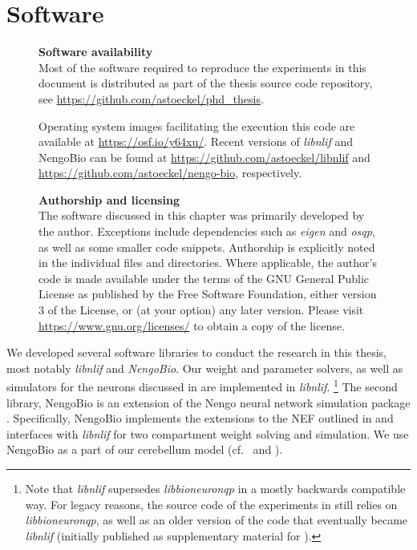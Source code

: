 
\chapter{Software}
\label{app:software}

\begin{figure}[b!]
\begin{shaded}
\small%
\sffamily%
\setlength{\parskip}{0.5em}
\noindent\textbf{Software availability}\\[0.25cm]
Most of the software required to reproduce the experiments in this document is distributed as part of the thesis source code repository, see \url{https://github.com/astoeckel/phd_thesis}.

Operating system images facilitating the execution this code are available at \url{https://osf.io/y64xu/}.
Recent versions of \emph{libnlif} and NengoBio can be found at \url{https://github.com/astoeckel/libnlif} and \url{https://github.com/astoeckel/nengo-bio}, respectively.
\end{shaded}
\end{figure}

\begin{figure}[b!]
\begin{shaded}
\small%
\sffamily%
\noindent\textbf{Authorship and licensing}\\[0.25cm]
The software discussed in this chapter was primarily developed by the author.
Exceptions include dependencies such as \emph{eigen} and \emph{osqp}, as well as some smaller code snippets.
Authorship is explicitly noted in the individual files and directories.
Where applicable, the author's code is made available under the terms of the GNU General Public License as published by
the Free Software Foundation, either version 3 of the License, or
(at your option) any later version.
Please visit \url{https://www.gnu.org/licenses/} to obtain a copy of the license.
\end{shaded}
\end{figure}

We developed several software libraries to conduct the research in this thesis, most notably \emph{libnlif} and \emph{NengoBio}.
Our weight and parameter solvers, as well as simulators for the \nlif neurons discussed in  are implemented in \emph{libnlif}.%
\footnote{
Note that \emph{libnlif} supersedes \emph{libbioneuronqp} in a mostly backwards compatible way.
For legacy reasons, the source code of the experiments in  still relies on \emph{libbioneuronqp}, as well as an older version of the code that eventually became \emph{libnlif} (initially published as supplementary material for \cite{stoeckel2021}).
}
The second library, NengoBio is an extension of the Nengo neural network simulation package \citep{bekolay2014nengo}.
Specifically, NengoBio implements the extensions to the NEF outlined in  and interfaces with \emph{libnlif} for two compartment weight solving and simulation.
We use NengoBio as a part of our cerebellum model (cf.~ and \cite{stockel2021connecting}).


